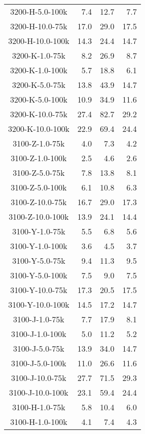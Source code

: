 \begin{longtable}{crrr}
    3200-H-5.0-100k  &    7.4 &   12.7 &    7.7 \\
    3200-H-10.0-75k  &   17.0 &   29.0 &   17.5 \\
    3200-H-10.0-100k &   14.3 &   24.4 &   14.7 \\
    3200-K-1.0-75k   &    8.2 &   26.9 &    8.7 \\
    3200-K-1.0-100k  &    5.7 &   18.8 &    6.1 \\
    3200-K-5.0-75k   &   13.8 &   43.9 &   14.7 \\
    3200-K-5.0-100k  &   10.9 &   34.9 &   11.6 \\
    3200-K-10.0-75k  &   27.4 &   82.7 &   29.2 \\
    3200-K-10.0-100k &   22.9 &   69.4 &   24.4 \\
    3100-Z-1.0-75k   &    4.0 &    7.3 &    4.2 \\
    3100-Z-1.0-100k  &    2.5 &    4.6 &    2.6 \\
    3100-Z-5.0-75k   &    7.8 &   13.8 &    8.1 \\
    3100-Z-5.0-100k  &    6.1 &   10.8 &    6.3 \\
    3100-Z-10.0-75k  &   16.7 &   29.0 &   17.3 \\
    3100-Z-10.0-100k &   13.9 &   24.1 &   14.4 \\
    3100-Y-1.0-75k   &    5.5 &    6.8 &    5.6 \\
    3100-Y-1.0-100k  &    3.6 &    4.5 &    3.7 \\
    3100-Y-5.0-75k   &    9.4 &   11.3 &    9.5 \\
    3100-Y-5.0-100k  &    7.5 &    9.0 &    7.5 \\
    3100-Y-10.0-75k  &   17.3 &   20.5 &   17.5 \\
    3100-Y-10.0-100k &   14.5 &   17.2 &   14.7 \\
    3100-J-1.0-75k   &    7.7 &   17.9 &    8.1 \\
    3100-J-1.0-100k  &    5.0 &   11.2 &    5.2 \\
    3100-J-5.0-75k   &   13.9 &   34.0 &   14.7 \\
    3100-J-5.0-100k  &   11.0 &   26.6 &   11.6 \\
    3100-J-10.0-75k  &   27.7 &   71.5 &   29.3 \\
    3100-J-10.0-100k &   23.1 &   59.4 &   24.4 \\
    3100-H-1.0-75k   &    5.8 &   10.4 &    6.0 \\
    3100-H-1.0-100k  &    4.1 &    7.4 &    4.3 \\

\end{longtable}
